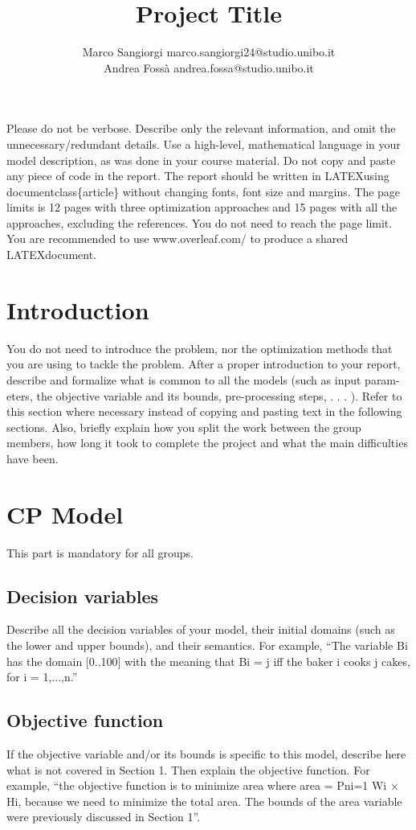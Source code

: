 \documentclass{article}
\title{\textbf{Project Title}}
\author{Marco Sangiorgi marco.sangiorgi24@studio.unibo.it \\
Andrea Fossà andrea.fossa@studio.unibo.it }
\begin{document}
\maketitle
Please do not be verbose. Describe only the relevant information, and omit the unnecessary/redundant details. Use a high-level, mathematical language in your model description, as was done in your course material. Do not copy and paste any piece of code in the report.
The report should be written in LATEXusing \\documentclass\{article\} without changing fonts, font size and margins. The page limits is 12 pages with three optimization approaches and 15 pages with all the approaches, excluding the references. You do not need to reach the page limit. You are recommended to use www.overleaf.com/ to produce a shared LATEXdocument.

\section{Introduction}
You do not need to introduce the problem, nor the optimization methods that you are using to tackle the problem. After a proper introduction to your report, describe and formalize what is common to all the models (such as input param- eters, the objective variable and its bounds, pre-processing steps, . . . ). Refer to this section where necessary instead of copying and pasting text in the following sections.
Also, briefly explain how you split the work between the group members, how long it took to complete the project and what the main difficulties have been.


\section{CP Model}
This part is mandatory for all groups.

\subsection{Decision variables}
Describe all the decision variables of your model, their initial domains (such as the lower and upper bounds), and their semantics. For example, “The variable Bi has the domain [0..100] with the meaning that Bi = j iff the baker i cooks j cakes, for i = 1,...,n.”

\subsection{Objective function}
If the objective variable and/or its bounds is specific to this model, describe here what is not covered in Section 1. Then explain the objective function. For example, “the objective function is to minimize area where area = Pni=1 Wi × Hi, because we need to minimize the total area. The bounds of the area variable were previously discussed in Section 1”.
\end{document}
